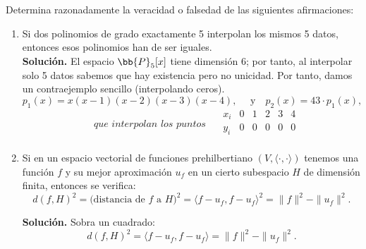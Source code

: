 \documentclass[12pt]{article}
\begin{document}
	\newpage
	\setcounter{ejercicio}{0}
	\begin{ejercicio}
		Determina razonadamente la veracidad o falsedad de las siguientes afirmaciones:
		\begin{enumerate}[label=\alph*)]
			\item Si dos polinomios de grado exactamente 5 interpolan los mismos 5 datos, entonces esos polinomios han de ser iguales. \\
			
				\textbf{Solución. } El espacio $\bb{P}_5[x]$ tiene dimensión 6; por tanto, al interpolar solo 5 datos sabemos que hay existencia pero no unicidad. Por tanto, damos un contraejemplo sencillo (interpolando ceros).\\
				$$p_1(x) = x(x - 1)(x - 2)(x - 3)(x - 4), \quad \text{ y} \quad p_2(x) = 43 \cdot p_1(x), $$
				$$\quad \textit{que interpolan los puntos } \quad
				\begin{array}{c|ccccc}
					x_i & 0 & 1 & 2 & 3 & 4 \\
					\hline
					y_i & 0 & 0 & 0 & 0 & 0 \\
				\end{array}$$
				
			\item Si en un espacio vectorial de funciones prehilbertiano $(V, \langle \cdot, \cdot \rangle)$ tenemos una función $f$ y su mejor aproximación $u_f$ en un cierto subespacio $H$ de dimensión finita, entonces se verifica:
			$$ d(f, H)^2 = \text{(distancia de } f \text{ a } H)^2 = \langle f - u_f, f - u_f \rangle^2 = \|f\|^2 - \|u_f\|^2.$$
			
				\textbf{Solución. } Sobra un cuadrado:
				$$ d(f, H)^2 = \langle f - u_f, f - u_f \rangle = \|f\|^2 - \|u_f\|^2.$$
		\end{enumerate}
	\end{ejercicio}
	
\end{document}
